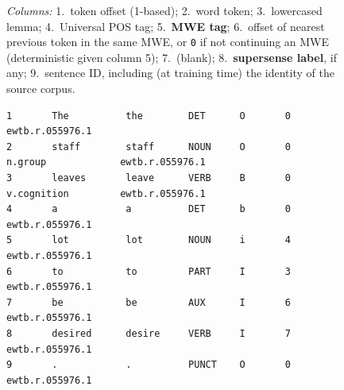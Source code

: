 \documentclass[11pt,letterpaper]{article}
\begin{document}
\begin{figure}\small
\emph{Columns:} 1.~token offset (1-based); 2.~word token; 3.~lowercased lemma; 
4.~Universal POS tag; 5.~\textbf{MWE tag}; 6.~offset of nearest previous token 
in the same MWE, or \texttt{0} if not continuing an MWE (deterministic given column 5); 7.~(blank);
8.~\textbf{supersense label}, if any; 9.~sentence ID, including (at training time) the identity of the source corpus.
\begin{verbatim}
1       The          the        DET      O       0                                   ewtb.r.055976.1
2       staff        staff      NOUN     O       0               n.group             ewtb.r.055976.1
3       leaves       leave      VERB     B       0               v.cognition         ewtb.r.055976.1
4       a            a          DET      b       0                                   ewtb.r.055976.1
5       lot          lot        NOUN     i       4                                   ewtb.r.055976.1
6       to           to         PART     I       3                                   ewtb.r.055976.1
7       be           be         AUX      I       6                                   ewtb.r.055976.1
8       desired      desire     VERB     I       7                                   ewtb.r.055976.1
9       .            .          PUNCT    O       0                                   ewtb.r.055976.1


\end{verbatim}
\end{figure}
\end{document}
